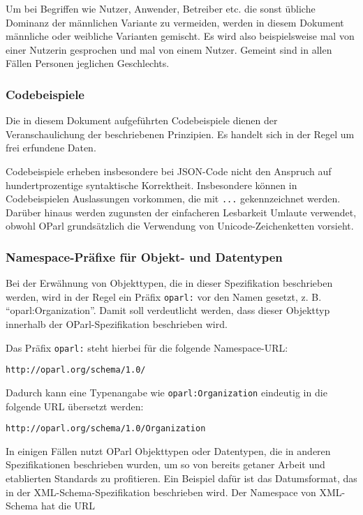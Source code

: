 \documentclass[,a4paper]{article}
\begin{document}
Um bei Begriffen wie Nutzer, Anwender, Betreiber etc. die sonst übliche
Dominanz der männlichen Variante zu vermeiden, werden in diesem Dokument
männliche oder weibliche Varianten gemischt. Es wird also beispielsweise
mal von einer Nutzerin gesprochen und mal von einem Nutzer. Gemeint sind
in allen Fällen Personen jeglichen Geschlechts.

\subsubsection{Codebeispiele}\label{codebeispiele}

Die in diesem Dokument aufgeführten Codebeispiele dienen der
Veranschaulichung der beschriebenen Prinzipien. Es handelt sich in der
Regel um frei erfundene Daten.

Codebeispiele erheben insbesondere bei JSON-Code nicht den Anspruch auf
hundertprozentige syntaktische Korrektheit. Insbesondere können in
Codebeispielen Auslassungen vorkommen, die mit \texttt{...}
gekennzeichnet werden. Darüber hinaus werden zugunsten der einfacheren
Lesbarkeit Umlaute verwendet, obwohl OParl grundsätzlich die Verwendung
von Unicode-Zeichenketten vorsieht.

\subsubsection{Namespace-Präfixe für Objekt- und
Datentypen}\label{namespace-pruxe4fixe-fuxfcr-objekt--und-datentypen}

Bei der Erwähnung von Objekttypen, die in dieser Spezifikation
beschrieben werden, wird in der Regel ein Präfix \texttt{oparl:} vor den
Namen gesetzt, z. B. ``oparl:Organization''. Damit soll verdeutlicht
werden, dass dieser Objekttyp innerhalb der OParl-Spezifikation
beschrieben wird.

Das Präfix \texttt{oparl:} steht hierbei für die folgende Namespace-URL:

\begin{verbatim}
http://oparl.org/schema/1.0/
\end{verbatim}

Dadurch kann eine Typenangabe wie \texttt{oparl:Organization} eindeutig
in die folgende URL übersetzt werden:

\begin{verbatim}
http://oparl.org/schema/1.0/Organization
\end{verbatim}

In einigen Fällen nutzt OParl Objekttypen oder Datentypen, die in
anderen Spezifikationen beschrieben wurden, um so von bereits getaner
Arbeit und etablierten Standards zu profitieren. Ein Beispiel dafür ist
das Datumsformat, das in der XML-Schema-Spezifikation beschrieben wird.
Der Namespace von XML-Schema hat die URL
\end{document}
